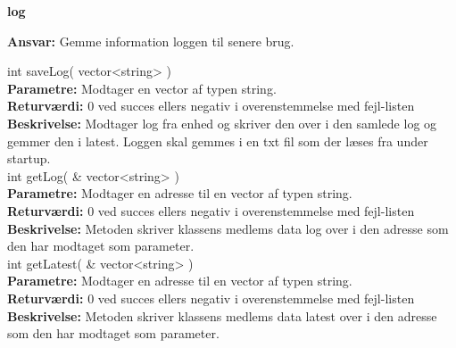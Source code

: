{\centering
\textbf{log}\par
}
\textbf{Ansvar:} Gemme information loggen til senere brug. \

int saveLog( vector<string> ) \\
\textbf{Parametre:} Modtager en vector af typen string. \\
\textbf{Returværdi:} 0 ved succes ellers negativ i overenstemmelse med fejl-listen \\
\textbf{Beskrivelse:} Modtager log fra enhed og skriver den over i den samlede log og gemmer den i latest. Loggen skal gemmes i en txt fil som der læses fra under startup. \\

int getLog( \& vector<string> )  \\
\textbf{Parametre:} Modtager en adresse til en vector af typen string. \\
\textbf{Returværdi:} 0 ved succes ellers negativ i overenstemmelse med fejl-listen \\
\textbf{Beskrivelse:} Metoden skriver klassens medlems data log over i den adresse som den har modtaget som parameter.\\

int getLatest( \& vector<string> ) \\
\textbf{Parametre:} Modtager en adresse til en vector af typen string.  \\
\textbf{Returværdi:} 0 ved succes ellers negativ i overenstemmelse med fejl-listen \\
\textbf{Beskrivelse:} Metoden skriver klassens medlems data latest over i den adresse som den har modtaget som parameter.\\


